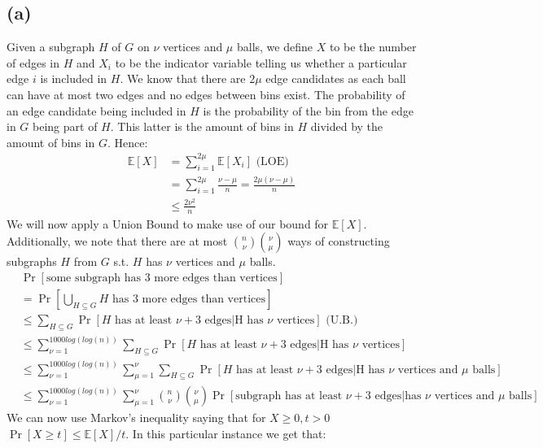 \documentclass[a4paper,german]{article}
\newcommand{\E}{\mathbb{E}}
\begin{document}
\subsection*{(a)}
	Given a subgraph \(H\) of \(G\) on \(\nu\) vertices and \(\mu\) balls, we define \(X\) to be the number of edges in \(H\) and \(X_i\) to be the indicator variable telling us whether a particular edge \(i\) is included in \(H\). We know that there are \(2\mu\) edge candidates as each ball can have at most two edges and no edges between bins exist. The probability of an edge candidate being included in \(H\) is the probability of the bin from the edge in \(G\) being part of \(H\). This latter is the amount of bins in \(H\) divided by the amount of bins in \(G\). Hence:
	\begin{align*}
		\E[X] &= \sum_{i=1}^{2\mu} \E[X_i] \text{ (LOE)} \\
		&= \sum_{i=1}^{2\mu} \frac{\nu - \mu}{n} = \frac{2\mu(\nu - \mu)}{n} \\
		&\leq \frac{2 \nu^2}{n}
	\end{align*}
	We will now apply a Union Bound to make use of our bound for \(\E[X]\). Additionally, we note that there are at most \({n \choose \nu}{\nu \choose \mu}\) ways of constructing subgraphs \(H\) from \(G\) s.t. \(H\) has \(\nu\) vertices and \(\mu\) balls. 
	\begin{align*}
		& \Pr[\text{some subgraph has 3 more edges than vertices}] \\
		&= \Pr[ \bigcup_{H \subseteq G} H \text{ has 3 more edges than vertices}] \\
		&\leq \sum_{H \subseteq G}  \Pr[H \text { has at least }  \nu + 3 \text{ edges} | \text{H has } \nu \text{ vertices}]  \text{ (U.B.)} \\
		&\leq \sum_{\nu = 1}^{1000 log(log(n))} \sum_{H \subseteq G}  \Pr[H \text { has at least } \nu + 3 \text{ edges} | \text{H has } \nu \text{ vertices}]\\
		&\leq \sum_{\nu = 1}^{1000 log(log(n))} \sum_{\mu = 1}^{\nu} \sum_{H \subseteq G}  \Pr[H \text { has at least } \nu + 3 \text{ edges} | \text{H has } \nu \text{ vertices and } \mu \text{ balls}] \\
		&\leq \sum_{\nu = 1}^{1000 log(log(n))} \sum_{\mu = 1}^{\nu} {n \choose \nu} {\nu \choose \mu} \Pr[\text {subgraph has at least } \nu + 3 \text{ edges} |  \text{has } \nu \text{ vertices and } \mu \text{ balls}]
	\end{align*}
	We can now use Markov's inequality saying that for \(X \geq 0, t >0\) \(\Pr[X \geq t] \leq \E[X] / t\). In this particular instance we get that:
\end{document}
